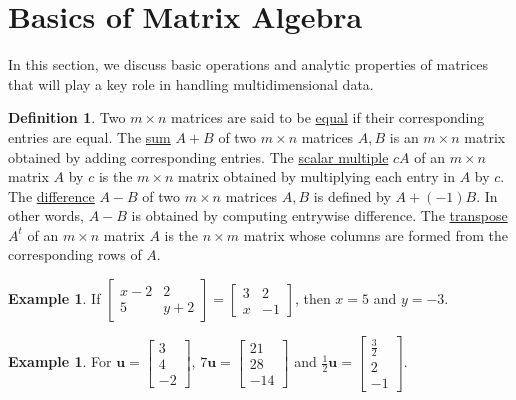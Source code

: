 \documentclass[12pt,letterpaper]{book}
\numberwithin{equation}{section}
\theoremstyle{definition}
\newtheorem{defi}[thm]{\textbf{Definition}}
\newtheorem{example}[thm]{\textbf{Example}}
\newcommand{\vu}{\bm{u}}
\begin{document}
\section{Basics of Matrix Algebra}

In this section, we discuss basic operations and analytic properties of matrices that will play a key role in handling multidimensional data.

\begin{defi} Two $m\times n$ matrices are said to be \underline{equal}
if their corresponding entries are equal. The \underline{sum}
$A+B$ of two $m\times n$ matrices $A,B$ is an $m \times n$ matrix obtained by adding corresponding entries.  The \underline{scalar multiple} $cA$ of an $m \times n$ matrix
$A$ by $c$ is the $m \times n$ matrix obtained by multiplying each entry
in $A$ by $c$. The \underline{difference} $A-B$ of two $m \times n$ matrices $A,B$ is defined by $A+(-1)B$. In other words, $A-B$ is obtained by computing entrywise difference. The \underline{transpose} $A^t$ of an $m\times n$ matrix $A$ is the $n\times m$ matrix whose columns are formed from the corresponding rows of $A$.
\end{defi}

\begin{example} If $\left[\begin{array}{cc} x-2 & 2 \\ 5 & y+2
\end{array}\right]=\left[\begin{array}{rr} 3 & 2 \\ x & -1
\end{array}\right]$, then $x=5$ and $y=-3$.
\end{example}

\begin{example} For $\vu=\left[\begin{array}{r} 3 \\ 4 \\ -2
\end{array}\right]$, $7\vu=\left[\begin{array}{r} 21 \\ 28 \\ -14
\end{array}\right]$ and $\frac{1}{2}\vu=\left[\begin{array}{r} \frac{3}{2} \\ 2 \\
-1 \end{array}\right]$.
\end{example}
\end{document}
